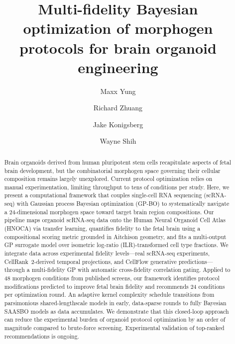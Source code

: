 \documentclass[times,twoside]{zHenriquesLab-StyleBioRxiv}
\begin{document}
\title{Multi-fidelity Bayesian optimization of morphogen protocols for brain organoid engineering}

\author[1,\Letter]{Maxx Yung}
\author[1,2]{Richard Zhuang}
\author[1,2]{Jake Konigsberg}
\author[1,3]{Wayne Shih}


\maketitle

\begin{abstract}
Brain organoids derived from human pluripotent stem cells recapitulate aspects of fetal brain development, but the combinatorial morphogen space governing their cellular composition remains largely unexplored. Current protocol optimization relies on manual experimentation, limiting throughput to tens of conditions per study. Here, we present a computational framework that couples single-cell RNA sequencing (scRNA-seq) with Gaussian process Bayesian optimization (GP-BO) to systematically navigate a 24-dimensional morphogen space toward target brain region compositions. Our pipeline maps organoid scRNA-seq data onto the Human Neural Organoid Cell Atlas (HNOCA) via transfer learning, quantifies fidelity to the fetal brain using a compositional scoring metric grounded in Aitchison geometry, and fits a multi-output GP surrogate model over isometric log-ratio (ILR)-transformed cell type fractions. We integrate data across experimental fidelity levels---real scRNA-seq experiments, CellRank~2-derived temporal projections, and CellFlow generative predictions---through a multi-fidelity GP with automatic cross-fidelity correlation gating. Applied to 48 morphogen conditions from published screens, our framework identifies protocol modifications predicted to improve fetal brain fidelity and recommends 24 conditions per optimization round. An adaptive kernel complexity schedule transitions from parsimonious shared-lengthscale models in early, data-sparse rounds to fully Bayesian SAASBO models as data accumulates. We demonstrate that this closed-loop approach can reduce the experimental burden of organoid protocol optimization by an order of magnitude compared to brute-force screening. Experimental validation of top-ranked recommendations is ongoing.
\end{abstract}
\end{document}
